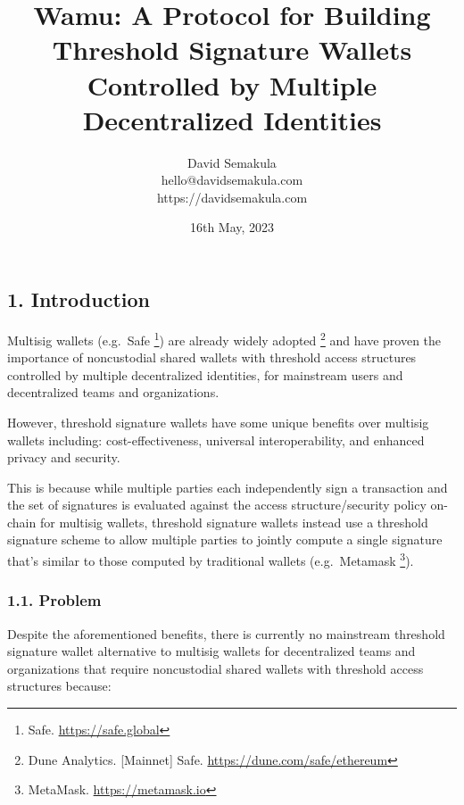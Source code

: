 \documentclass[
]{article}
\title{Wamu: A Protocol for Building Threshold Signature Wallets
Controlled by Multiple Decentralized Identities}
\author{David Semakula\\
hello@davidsemakula.com\\
https://davidsemakula.com}
\date{16th May, 2023}
\begin{document}
\maketitle

{
\setcounter{tocdepth}{3}
\tableofcontents
}
\hypertarget{introduction}{%
\subsection{1. Introduction}\label{introduction}}

Multisig wallets (e.g.~Safe \footnote{Safe. \url{https://safe.global}})
are already widely adopted \footnote{Dune Analytics. {[}Mainnet{]} Safe.
  \url{https://dune.com/safe/ethereum}} and have proven the importance
of noncustodial shared wallets with threshold access structures
controlled by multiple decentralized identities, for mainstream users
and decentralized teams and organizations.

However, threshold signature wallets have some unique benefits over
multisig wallets including: cost-effectiveness, universal
interoperability, and enhanced privacy and security.

This is because while multiple parties each independently sign a
transaction and the set of signatures is evaluated against the access
structure/security policy on-chain for multisig wallets, threshold
signature wallets instead use a threshold signature scheme to allow
multiple parties to jointly compute a single signature that's similar to
those computed by traditional wallets (e.g.~Metamask \footnote{MetaMask.
  \url{https://metamask.io}}).

\hypertarget{problem}{%
\subsubsection{1.1. Problem}\label{problem}}

Despite the aforementioned benefits, there is currently no mainstream
threshold signature wallet alternative to multisig wallets for
decentralized teams and organizations that require noncustodial shared
wallets with threshold access structures because:
\end{document}
